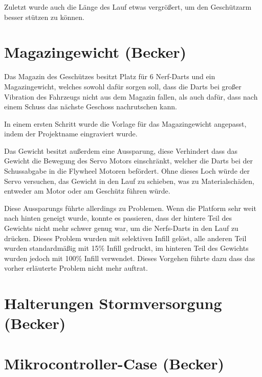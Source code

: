 Zuletzt wurde auch die Länge des Lauf etwas vergrößert, um den Geschützarm besser stützen zu können.

\section{Magazingewicht (Becker)}

Das Magazin des Geschützes besitzt Platz für 6 Nerf-Darts und ein Magazingewicht, welches sowohl dafür sorgen soll, 
dass die Darts bei großer Vibration des Fahrzeugs nicht aus dem Magazin fallen, als auch dafür, dass nach einem Schuss das 
nächste Geschoss nachrutschen kann. 

In einem ersten Schritt wurde die Vorlage für das Magazingewicht angepasst, indem der Projektname eingraviert wurde.

Das Gewicht besitzt außerdem eine Aussparung, diese Verhindert dass das Gewicht die Bewegung des Servo Motors einschränkt, welcher die Darts
bei der Schussabgabe in die Flywheel Motoren befördert. Ohne dieses Loch würde der Servo versuchen, das Gewicht in den Lauf zu schieben,
was zu Materialschäden, entweder am Motor oder am Geschütz führen würde.

Diese Aussparungs führte allerdings zu Problemen. Wenn die Platform sehr weit nach
hinten geneigt wurde, konnte es passieren, dass der hintere Teil des Gewichts nicht mehr schwer genug war, um die Nerfs-Darts
in den Lauf zu drücken. Dieses Problem wurden mit selektiven Infill gelöst, alle anderen Teil wurden standardmäßig mit 15\% Infill gedruckt,
im hinteren Teil des Gewichts wurden jedoch mit 100\% Infill verwendet. Dieses Vorgehen führte dazu dass das vorher erläuterte Problem nicht mehr auftrat.

\section{Halterungen Stormversorgung (Becker)}

\section{Mikrocontroller-Case (Becker)}